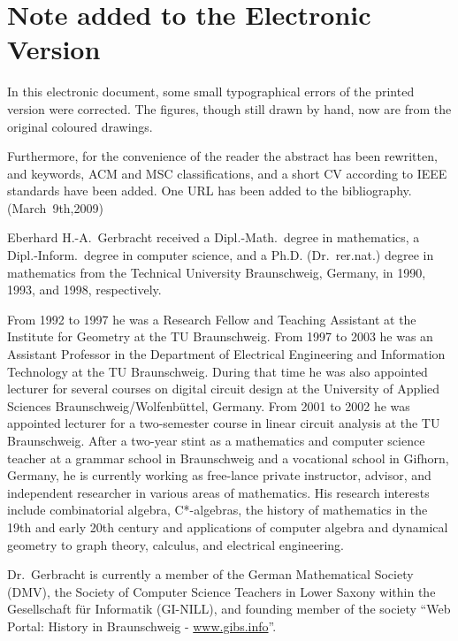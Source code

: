 \documentclass[10pt,journal,twocolumn,pagenumbers]{IEEEtran}
\begin{document}
\section*{Note added to the Electronic Version}
In this electronic document, some small typographical errors of the printed version were corrected. The figures, though still drawn by hand, now are from the original coloured drawings.

Furthermore, for the convenience of the reader the abstract has been rewritten, and keywords, ACM and MSC classifications, and a short CV according to IEEE standards have been added. One URL has been added to the bibliography.\phantom{mmmmmmmmm}\hfill 
\phantom{m}\hfill (March~9th,2009)


\begin{biography}
{Eberhard H.-A.~Gerbracht}
received a Dipl.-Math.\ degree in mathematics, a Dipl.-Inform.\ degree in computer science, and a Ph.D. (Dr.\ rer.nat.) degree in mathematics from the Technical University Braunschweig, Germany, in 1990, 1993, and 1998, respectively.

From 1992 to 1997 he was a Research Fellow and Teaching Assistant at the Institute for Geometry at the TU Braunschweig. From 1997 to 2003 he was an Assistant Professor in the Department of Electrical Engineering and Information Technology at the TU Braunschweig. During that time he was also appointed lecturer for several courses on digital circuit design at the University of Applied Sciences Braunschweig/Wolfenb\"uttel, Germany. From 2001 to 2002 he was appointed lecturer for a two-semester course in linear circuit analysis at the TU Braunschweig. After a two-year stint as a mathematics and computer science teacher at a grammar school in Braunschweig and a vocational school in Gifhorn, Germany, he is currently working as free-lance private instructor, advisor, and independent researcher in various areas of mathematics. His research interests include combinatorial algebra, C*-algebras, the history of mathematics in the 19th and early 20th century and applications of computer algebra and dynamical geometry to graph theory, calculus, and electrical engineering.

Dr.~Gerbracht is currently a member of the German Mathematical Society (DMV), the Society of Computer Science Teachers in Lower Saxony within the Gesellschaft f\"ur Informatik (GI-NILL), and founding member of the society ``Web Portal: History in Braunschweig - \href{http://www.gibs.info}{www.gibs.info}''.
\end{biography}
\end{document}
